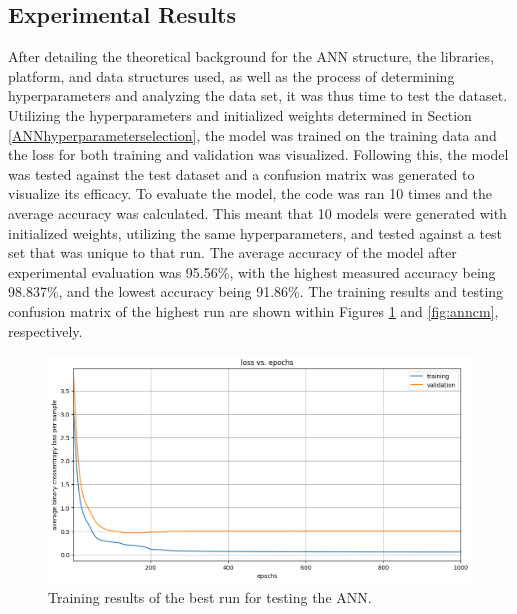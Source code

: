 \documentclass[a4paper]{article}
\begin{document}
\subsection{Experimental Results}

After detailing the theoretical background for the ANN structure, the libraries, platform, and data structures used, as well as the process of determining hyperparameters and analyzing the data set, it was thus time to test the dataset. Utilizing the hyperparameters and initialized weights determined in Section \ref{ANNhyperparameterselection}, the model was trained on the training data and the loss for both training and validation was visualized. Following this, the model was tested against the test dataset and a confusion matrix was generated to visualize its efficacy. To evaluate the model, the code was ran 10 times and the average accuracy was calculated. This meant that 10 models were generated with initialized weights, utilizing the same hyperparameters, and tested against a test set that was unique to that run. The average accuracy of the model after experimental evaluation was 95.56\%, with the highest measured accuracy being 98.837\%, and the lowest accuracy being 91.86\%. The training results and testing confusion matrix of the highest run are shown within Figures \ref{fig:anntrain} and \ref{fig:anncm}, respectively. 

\begin{figure}[h!]
    \centering
    \includegraphics[width=0.9\linewidth]{images/ANNtrain.png}
    \caption{Training results of the best run for testing the ANN.}
    \label{fig:anntrain}
\end{figure}
\end{document}
